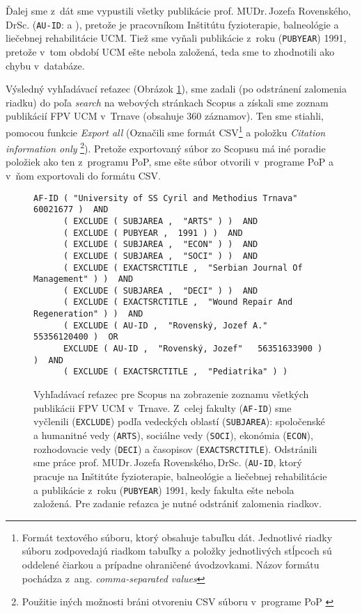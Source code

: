 Ďalej sme z~dát sme vypustili všetky publikácie prof. MUDr.\,Jozefa
Rovenského,\,DrSc.  (\texttt{AU-ID}:  a ), pretože je pracovníkom Inštitútu fyzioterapie, balneológie a
liečebnej rehabilitácie UCM. Tiež sme vyňali publikácie z~roku
(\texttt{PUBYEAR}) 1991, pretože v~tom období UCM ešte nebola založená, teda sme
to zhodnotili ako chybu v~databáze.

Výsledný vyhľadávací reťazec (Obrázok \ref{fig:scopus.query}), sme zadali (po
odstránení zalomenia riadku) do poľa \emph{search} na webových stránkach Scopus
a získali sme zoznam publikácií FPV UCM v~Trnave (obsahuje 360 záznamov). Ten
sme stiahli, pomocou funkcie \emph{Export all} (Označili sme formát
CSV\footnote{Formát textového súboru, ktorý obsahuje tabuľku dát. Jednotlivé
  riadky súboru zodpovedajú riadkom tabuľky a položky jednotlivých stĺpcoch sú
  oddelené čiarkou a prípadne ohraničené úvodzovkami.  Názov formátu pochádza
  z~ang.  \emph{comma-separated values}} a položku \emph{Citation information
  only} \footnote {Použitie iných možnosti bráni otvoreniu CSV súboru v~programe
  PoP \citep{Harzing2011}}).  Pretože exportovaný súbor zo Scopusu má iné
poradie položiek ako ten z~programu PoP, sme ešte súbor otvorili v~programe PoP
a v~ňom exportovali do formátu CSV.


\begin{figure}
  \footnotesize
  \begin{Verbatim}[frame=single]
    AF-ID ( "University of SS Cyril and Methodius Trnava"   60021677 )  AND
      ( EXCLUDE ( SUBJAREA ,  "ARTS" ) )  AND
      ( EXCLUDE ( PUBYEAR ,  1991 ) )  AND
      ( EXCLUDE ( SUBJAREA ,  "ECON" ) )  AND
      ( EXCLUDE ( SUBJAREA ,  "SOCI" ) )  AND
      ( EXCLUDE ( EXACTSRCTITLE ,  "Serbian Journal Of Management" ) )  AND
      ( EXCLUDE ( SUBJAREA ,  "DECI" ) )  AND
      ( EXCLUDE ( EXACTSRCTITLE ,  "Wound Repair And Regeneration" ) )  AND
      ( EXCLUDE ( AU-ID ,  "Rovenský, Jozef A."   55356120400 )  OR
      EXCLUDE ( AU-ID ,  "Rovenský, Jozef"   56351633900 ) )  AND
      ( EXCLUDE ( EXACTSRCTITLE ,  "Pediatrika" ) )
  \end{Verbatim}
  \vspace*{-4mm}
  \caption[Vyhľahávaci reťazec pre celú fakultu pre Scopus]%
  {Vyhľadávací reťazec pre Scopus na zobrazenie zoznamu všetkých publikácii FPV
    UCM v~Trnave.  Z~celej fakulty (\texttt{AF-ID}) sme vyčlenili
    (\texttt{EXCLUDE}) podľa vedeckých oblastí (\texttt{SUBJAREA}): spoločenské
    a humanitné vedy (\texttt{ARTS}), sociálne vedy (\texttt{SOCI}), ekonómia
    (\texttt{ECON}), rozhodovacie vedy (\texttt{DECI}) a časopisov
    (\texttt{EXACTSRCTITLE}).  Odstránili sme práce prof. MUDr.\,Jozefa
    Rovenského,\,DrSc.  (\texttt{AU-ID}, ktorý pracuje na Inštitúte
    fyzioterapie, balneológie a liečebnej rehabilitácie a publikácie z~roku
    (\texttt{PUBYEAR}) 1991, kedy fakulta ešte nebola založená. Pre zadanie
    reťazca je nutné odstrániť zalomenia riadkov.}
  \label{fig:scopus.query}
\end{figure}


